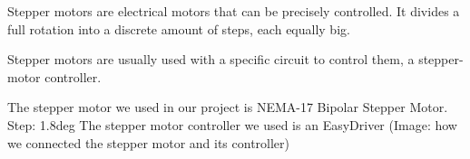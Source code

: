 Stepper motors are electrical motors that can be precisely controlled.
It divides a full rotation into a discrete amount of steps, each equally big.

Stepper motors are usually used with a specific circuit to control them, a stepper-motor controller.

The stepper motor we used in our project is NEMA-17 Bipolar Stepper Motor.
Step: 1.8deg
\cite{steppermotor}
The stepper motor controller we used is an EasyDriver
\cite{steppercontroller}
(Image: how we connected the stepper motor and its controller)
